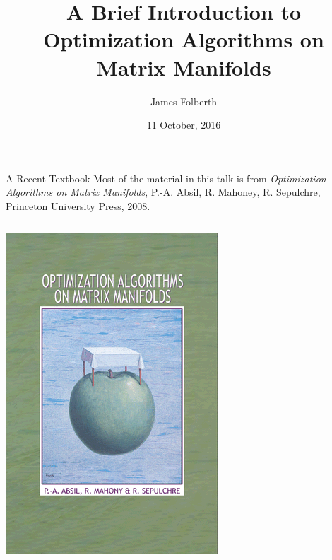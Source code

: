 \documentclass[xcolor=dvipsnames,t]{beamer} %
\title{A Brief Introduction to Optimization Algorithms on Matrix Manifolds}
\date{11 October, 2016}
\author{James Folberth} %
\institute{University of Colorado at Boulder}
\begin{document}
\begin{frame}
\maketitle
\end{frame}


\begin{frame}{A Recent Textbook}
   Most of the material in this talk is from \emph{Optimization Algorithms on Matrix Manifolds}, P.-A. Absil, R. Mahoney, R. Sepulchre, Princeton University Press, 2008.\\
   
   \begin{columns}
      \begin{column}{0.4\textwidth}
         \begin{center}
            \includegraphics[width=0.8\columnwidth]{figures/oaomm_cover.png}
         \end{center}


\end{column}
\end{columns}
\end{frame}
\end{document}
